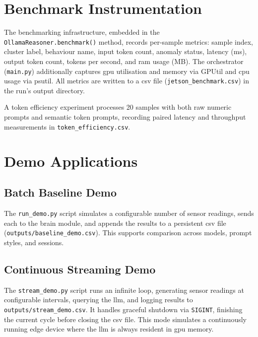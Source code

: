 \documentclass[12pt,a4paper,oneside]{report}
\begin{document}
\section{Benchmark Instrumentation}
\label{sec:impl-benchmark}

The benchmarking infrastructure, embedded in the \texttt{OllamaReasoner.benchmark()} method, records per-sample metrics: sample index, cluster label, behaviour name, input token count, anomaly status, latency (ms), output token count, tokens per second, and \gls{ram} usage (MB). The orchestrator (\texttt{main.py}) additionally captures \gls{gpu} utilisation and memory via GPUtil and \gls{cpu} usage via psutil. All metrics are written to a \gls{csv} file (\texttt{jetson\_benchmark.csv}) in the run's output directory.

A token efficiency experiment processes 20 samples with both raw numeric prompts and semantic token prompts, recording paired latency and throughput measurements in \texttt{token\_efficiency.csv}.


\section{Demo Applications}
\label{sec:impl-demos}

\subsection{Batch Baseline Demo}

The \texttt{run\_demo.py} script simulates a configurable number of sensor readings, sends each to the brain module, and appends the results to a persistent \gls{csv} file (\texttt{outputs/baseline\_demo.csv}). This supports comparison across models, prompt styles, and sessions.

\subsection{Continuous Streaming Demo}

The \texttt{stream\_demo.py} script runs an infinite loop, generating sensor readings at configurable intervals, querying the \gls{llm}, and logging results to \texttt{outputs/stream\_demo.csv}. It handles graceful shutdown via \texttt{SIGINT}, finishing the current cycle before closing the \gls{csv} file. This mode simulates a continuously running edge device where the \gls{llm} is always resident in \gls{gpu} memory.

\end{document}
